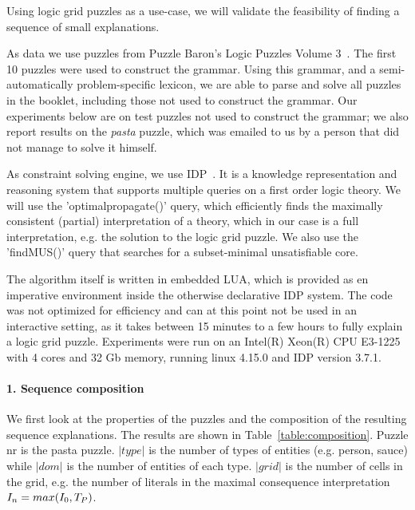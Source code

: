 Using logic grid puzzles as a use-case, we will validate the feasibility of finding a sequence of small explanations.

As data we use puzzles from Puzzle Baron’s Logic Puzzles Volume 3~\cite{logigrammen}. The first 10 puzzles were used to construct the grammar. Using this grammar, and a semi-automatically problem-specific lexicon, we are able to parse and solve all puzzles in the booklet, including those not used to construct the grammar. Our experiments below are on test puzzles not used to construct the grammar; we also report results on the \textit{pasta} puzzle, which was emailed to us by a person that did not manage to solve it himself.

As constraint solving engine, we use IDP~\cite{IDP}. It is a knowledge representation and reasoning system that supports multiple queries on a first order logic theory. We will use the 'optimalpropagate()' query, which efficiently finds the maximally consistent (partial) interpretation of a theory, which in our case is a full interpretation, e.g. the solution to the logic grid puzzle. We also use the 'findMUS()' query that searches for a subset-minimal unsatisfiable core.

The algorithm itself is written in embedded LUA, which is provided as en imperative environment inside the otherwise declarative IDP system. The code was not optimized for efficiency and can at this point not be used in an interactive setting, as it takes between 15 minutes to a few hours to fully explain a logic grid puzzle. Experiments were run on an Intel(R) Xeon(R) CPU E3-1225 with 4 cores and 32 Gb memory, running linux 4.15.0 and IDP version 3.7.1.

\paragraph{1. Sequence composition}
We first look at the properties of the puzzles and the composition of the resulting sequence explanations. The results are shown in Table~\ref{table:composition}. Puzzle nr  is the pasta puzzle. $|type|$ is the number of types of entities (e.g. person, sauce) while $|dom|$ is the number of entities of each type. $|grid|$ is the number of cells in the grid, e.g. the number of literals in the maximal consequence interpretation $I_n=max(I_0,T_P)$.

